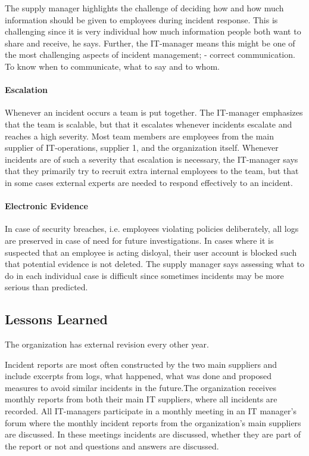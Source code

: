 The supply manager highlights the challenge of deciding how and how much information should be given to employees during incident response. This is challenging since it is very individual how much information people both want to share and receive, he says. Further, the IT-manager means this might be one of the most challenging aspects of incident management; - correct communication. To know when to communicate, what to say and to whom. 

\paragraph{Escalation}
Whenever an incident occurs a team is put together. The IT-manager emphasizes that the team is scalable, but that it escalates whenever incidents escalate and reaches a high severity. Most team members are employees from the main supplier of IT-operations, supplier 1, and the organization itself. Whenever incidents are of such a severity that escalation is necessary, the IT-manager says that they primarily try to recruit extra internal employees to the team, but that in some cases external experts are needed to respond effectively to an incident.

\paragraph{Electronic Evidence}
In case of security breaches, i.e. employees violating policies deliberately, all logs are preserved in case of need for future investigations. In cases where it is suspected that an employee is acting disloyal, their user account is blocked such that potential evidence is not deleted. The supply manager says assessing what to do in each individual case is difficult since sometimes incidents may be more serious than predicted. 

\subsection{Lessons Learned}
The organization has external revision every other year.

Incident reports are most often constructed by the two main suppliers and include excerpts from logs, what happened, what was done and proposed measures to avoid similar incidents in the future.The organization receives monthly reports from both their main IT suppliers, where all incidents are recorded. All IT-managers participate in a monthly meeting in an IT manager's forum where the monthly incident reports from the organization's main suppliers are discussed. In these meetings incidents are discussed, whether they are part of the report or not and questions and answers are discussed.

